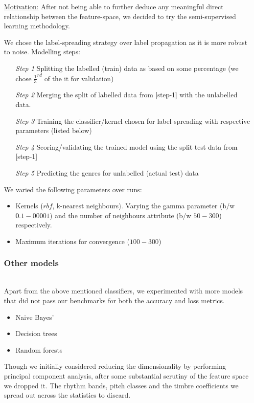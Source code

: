 \documentclass[fleqn,10pt]{SelfArx} %
\begin{document}
\underline{Motivation:} After not being able to further deduce any meaningful direct relationship between the feature-space, we decided to try the semi-supervised learning methodology.

We chose the label-spreading strategy over label propagation as it is more robust to noise{\cite{label-spreading}}. Modelling steps:
\begin{itemize}
  \item[\textit{Step 1}] Splitting the labelled (train) data as based on some percentage (we chose $\frac{1}{3}^{rd}$ of the it for validation)
  \item[\textit{Step 2}] Merging the split of labelled data from [step-1] with the unlabelled data.
  \item[\textit{Step 3}] Training the classifier/kernel chosen for label-spreading with respective parameters (listed below)
  \item[\textit{Step 4}] Scoring/validating the trained model using the split test data from [step-1]
  \item[\textit{Step 5}] Predicting the genres for unlabelled (actual test) data
\end{itemize}

We varied the following parameters over runs:
\begin{itemize}
  \item Kernels ($rbf$, k-nearest neighbours). Varying the gamma parameter (b/w $0.1-00001$) and the number of neighbours attribute (b/w $50-300$) respectively.
  \item Maximum iterations for convergence ($100-300$)
\end{itemize}

\subsubsection*{Other models}~\\
Apart from the above mentioned classifiers, we experimented with more models that did not pass our benchmarks for both the accuracy and loss metrics.
\begin{itemize}
  \item Naive Bayes'
  \item Decision trees
  \item Random forests
\end{itemize}

Though we initially considered reducing the dimensionality by performing principal component analysis, after some substantial scrutiny of the feature space we dropped it. The rhythm bands, pitch classes and the timbre coefficients we spread out across the statistics to discard.
\end{document}

